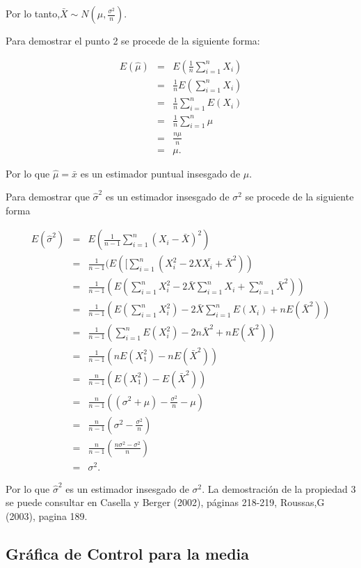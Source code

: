 \documentclass[english]{report}
\begin{document}
Por lo tanto,$\bar{X}\sim N(\mu,\frac{\sigma^{2}}{n})$.

Para demostrar el punto 2 se procede de la siguiente forma: 

\begin{eqnarray*}
E(\hat{\mu}) & = & E(\frac{1}{n}\sum_{i=1}^{n}X_{i})\\
 & = & \frac{1}{n}E(\sum_{i=1}^{n}X_{i})\\
 & = & \frac{1}{n}\sum_{i=1}^{n}E(X_{i})\\
 & = & \frac{1}{n}\sum_{i=1}^{n}\mu\\
 & = & \frac{n\mu}{n}\\
 & = & \mu.
\end{eqnarray*}

Por lo que $\hat{\mu}=\bar{x}$ es un estimador puntual insesgado
de $\mu$.

Para demostrar que $\hat{\sigma}^{2}$ es un estimador insesgado
de $\sigma^{2}$ se procede de la siguiente forma


\begin{eqnarray*}
E(\hat{\sigma}^{2}) & = & E(\frac{1}{n-1}\sum_{i=1}^{n}(X_{i}-\bar{X})^{2})\\
 & = & \frac{1}{n-1}(E([\sum_{i=1}^{n}(X_{i}^{2}-2\bar{XX_{i}+}\bar{X}^{2}))\\
 & = & \frac{1}{n-1}(E(\sum_{i=1}^{n}X_{i}^{2}-2\bar{X}\sum_{i=1}^{n}X_{i}+\sum_{i=1}^{n}\bar{X}^{2}))\\
 & = & \frac{1}{n-1}(E(\sum_{i=1}^{n}X_{i}^{2})-2\bar{X}\sum_{i=1}^{n}E(X_{i})+nE(\bar{X}^{2}))\\
 & = & \frac{1}{n-1}(\sum_{i=1}^{n}E(X_{i}^{2})-2n\bar{X}^{2}+nE(\bar{X}^{2}))\\
 & = & \frac{1}{n-1}(nE(X_{1}^{2})-nE(\bar{X}^{2}))\\
 & = & \frac{n}{n-1}(E(X_{1}^{2})-E(\bar{X}^{2}))\\
 & = & \frac{n}{n-1}((\sigma^{2}+\mu)-\frac{\sigma^{2}}{n}-\mu)\\
 & = & \frac{n}{n-1}(\sigma^{2}-\frac{\sigma^{2}}{n})\\
 & = & \frac{n}{n-1}(\frac{n\sigma^{2}-\sigma^{2}}{n})\\
 & = & \sigma^{2}.
\end{eqnarray*}


Por lo que $\hat{\sigma}^{2}$ es un estimador insesgado de $\sigma^{2}$. La
demostración de la propiedad 3 se puede consultar en Casella y Berger
(2002), páginas 218-219, Roussas,G (2003), pagina 189.


\subsection{Gráfica de Control para la media}
\end{document}
